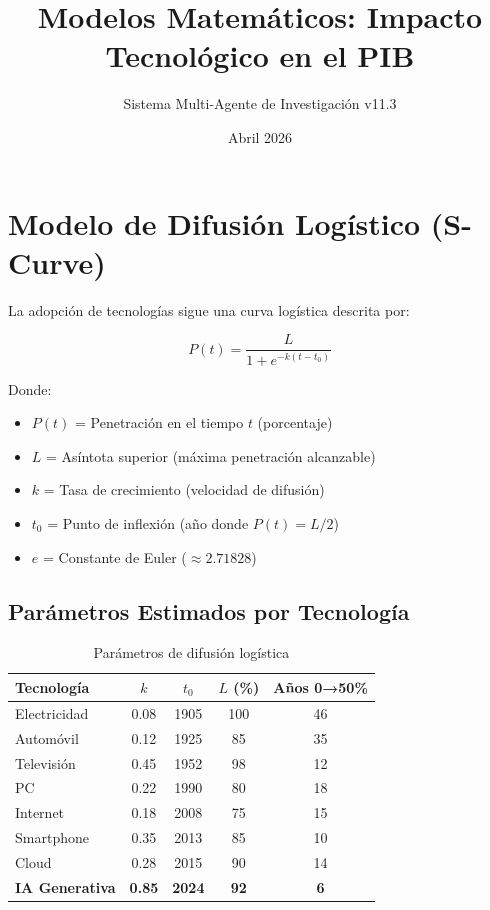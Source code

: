 \documentclass{article}
\title{Modelos Matemáticos: Impacto Tecnológico en el PIB}
\author{Sistema Multi-Agente de Investigación v11.3}
\date{Abril 2026}
\begin{document}
\maketitle

\section{Modelo de Difusión Logístico (S-Curve)}

La adopción de tecnologías sigue una curva logística descrita por:

\begin{equation}
P(t) = \frac{L}{1 + e^{-k(t - t_0)}}
\end{equation}

Donde:
\begin{itemize}
    \item $P(t)$ = Penetración en el tiempo $t$ (porcentaje)
    \item $L$ = Asíntota superior (máxima penetración alcanzable)
    \item $k$ = Tasa de crecimiento (velocidad de difusión)
    \item $t_0$ = Punto de inflexión (año donde $P(t) = L/2$)
    \item $e$ = Constante de Euler ($\approx 2.71828$)
\end{itemize}

\subsection{Parámetros Estimados por Tecnología}

\begin{table}[h]
\centering
\begin{tabular}{|l|c|c|c|c|}
\hline
\textbf{Tecnología} & $k$ & $t_0$ & $L$ (\%) & \textbf{Años 0→50\%} \\
\hline
Electricidad & 0.08 & 1905 & 100 & 46 \\
Automóvil & 0.12 & 1925 & 85 & 35 \\
Televisión & 0.45 & 1952 & 98 & 12 \\
PC & 0.22 & 1990 & 80 & 18 \\
Internet & 0.18 & 2008 & 75 & 15 \\
Smartphone & 0.35 & 2013 & 85 & 10 \\
Cloud & 0.28 & 2015 & 90 & 14 \\
\textbf{IA Generativa} & \textbf{0.85} & \textbf{2024} & \textbf{92} & \textbf{6} \\
\hline
\end{tabular}
\caption{Parámetros de difusión logística}
\end{table}
\end{document}
